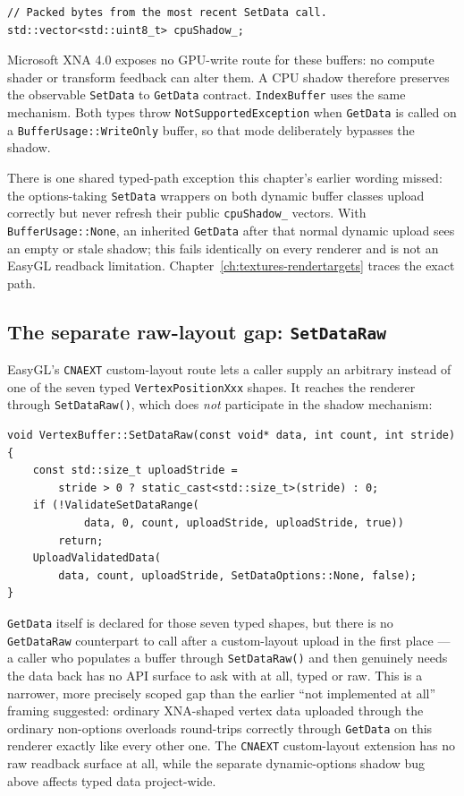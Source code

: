 \begin{lstlisting}
// Packed bytes from the most recent SetData call.
std::vector<std::uint8_t> cpuShadow_;
\end{lstlisting}

Microsoft XNA 4.0 exposes no GPU-write route for these buffers: no compute shader or transform
feedback can alter them. A CPU shadow therefore preserves the observable \texttt{SetData} to
\texttt{GetData} contract. \texttt{IndexBuffer} uses the same mechanism. Both types throw
\texttt{NotSupportedException} when \texttt{GetData} is called on a
\texttt{BufferUsage::WriteOnly} buffer, so that mode deliberately bypasses the shadow.

There is one shared typed-path exception this chapter's earlier wording missed:
the options-taking \texttt{SetData} wrappers on both dynamic buffer classes upload correctly
but never refresh their public \texttt{cpuShadow\_} vectors. With
\texttt{BufferUsage::None}, an inherited \texttt{GetData} after that normal dynamic upload
sees an empty or stale shadow; this fails identically on every renderer and is not an EasyGL
readback limitation. Chapter~\ref{ch:textures-rendertargets} traces the exact path.

\subsection{The separate raw-layout gap: \texttt{SetDataRaw}}

EasyGL's \texttt{CNAEXT} custom-layout route lets a caller supply an arbitrary
 instead of one of the seven typed
\texttt{VertexPositionXxx} shapes. It reaches the renderer through \texttt{SetDataRaw()}, which
does \emph{not} participate in the shadow mechanism:

\begin{lstlisting}
void VertexBuffer::SetDataRaw(const void* data, int count, int stride)
{
    const std::size_t uploadStride =
        stride > 0 ? static_cast<std::size_t>(stride) : 0;
    if (!ValidateSetDataRange(
            data, 0, count, uploadStride, uploadStride, true))
        return;
    UploadValidatedData(
        data, count, uploadStride, SetDataOptions::None, false);
}
\end{lstlisting}

\texttt{GetData} itself is declared for those seven typed shapes, but there is no
\texttt{GetDataRaw} counterpart to call after a custom-layout upload in the first place --- a
caller who populates a buffer through \texttt{SetDataRaw()} and then genuinely needs the data
back has no API surface to ask with at all, typed or raw. This is a narrower, more precisely
scoped gap than the earlier ``not implemented at all'' framing suggested: ordinary XNA-shaped
vertex data uploaded through the ordinary non-options overloads round-trips correctly through
\texttt{GetData} on this renderer exactly like every other one. The \texttt{CNAEXT}
custom-layout extension has no raw readback surface at all, while the separate dynamic-options
shadow bug above affects typed data project-wide.

